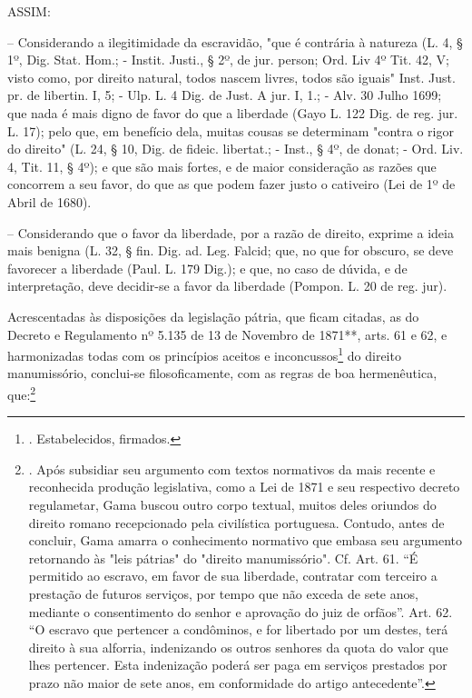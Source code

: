 ASSIM:

-- Considerando a ilegitimidade da escravidão, "que é contrária à
natureza (L. 4, § 1º, Dig. Stat. Hom.; - Instit. Justi., § 2º, de jur.
person; Ord. Liv 4º Tit. 42, V; visto como, por direito natural, todos
nascem livres, todos são iguais" Inst. Just. pr. de libertin. I, 5; -
Ulp. L. 4 Dig. de Just. A jur. I, 1.; - Alv. 30 Julho 1699; que nada é
mais digno de favor do que a liberdade (Gayo L. 122 Dig. de reg. jur. L.
17); pelo que, em benefício dela, muitas cousas se determinam "contra o
rigor do direito" (L. 24, § 10, Dig. de fideic. libertat.; - Inst., §
4º, de donat; - Ord. Liv. 4, Tit. 11, § 4º); e que são mais fortes, e de
maior consideração as razões que concorrem a seu favor, do que as que
podem fazer justo o cativeiro (Lei de 1º de Abril de 1680).

-- Considerando que o favor da liberdade, por a razão de direito,
exprime a ideia mais benigna (L. 32, § fin. Dig. ad. Leg. Falcid; que,
no que for obscuro, se deve favorecer a liberdade (Paul. L. 179 Dig.); e
que, no caso de dúvida, e de interpretação, deve decidir-se a favor da
liberdade (Pompon. L. 20 de reg. jur).

Acrescentadas às disposições da legislação pátria, que ficam citadas, as
do Decreto e Regulamento nº 5.135 de 13 de Novembro de 1871**, arts. 61
e 62, e harmonizadas todas com os princípios aceitos e
inconcussos\footnote{. Estabelecidos, firmados.} do direito
manumissório, conclui-se filosoficamente, com as regras de boa
hermenêutica, que:\footnote{. Após subsidiar seu argumento com textos
  normativos da mais recente e reconhecida produção legislativa, como a
  Lei de 1871 e seu respectivo decreto regulametar, Gama buscou outro
  corpo textual, muitos deles oriundos do direito romano recepcionado
  pela civilística portuguesa. Contudo, antes de concluir, Gama amarra o
  conhecimento normativo que embasa seu argumento retornando às "leis
  pátrias" do "direito manumissório". Cf. Art. 61. ``É permitido ao
  escravo, em favor de sua liberdade, contratar com terceiro a prestação
  de futuros serviços, por tempo que não exceda de sete anos, mediante o
  consentimento do senhor e aprovação do juiz de orfãos''. Art. 62. ``O
  escravo que pertencer a condôminos, e for libertado por um destes,
  terá direito à sua alforria, indenizando os outros senhores da quota
  do valor que lhes pertencer. Esta indenização poderá ser paga em
  serviços prestados por prazo não maior de sete anos, em conformidade
  do artigo antecedente''.}

